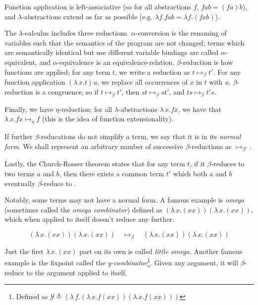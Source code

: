 \documentclass[logo,bsc,singlespacing,parskip,online]{infthesis}
\begin{document}
Function application is left-associative (so for all abstractions $f$, $f a b =
(f a) b$), and $\lambda$-abstractions extend as far as possible (e.g. $\lambda
f. f a b = \lambda f. (f a b)$).

The $\lambda$-calculus includes three reductions. $\alpha$-conversion is the
renaming of variables such that the semantics of the program are not changed;
terms which are semantically identical but use different variable bindings are
called $\alpha$-equivalent, and $\alpha$-equivalence is an equivalence-relation.
$\beta$-reduction is how functions are applied; for any term $t$, we write a
reduction as $t \mapsto_{\beta} t'$. For any function application $(\lambda \,
x. t) u$, we replace all occurrences of $x$ in $t$ with $u$. $\beta$-reduction
is a congruence, so if $t \mapsto_{\beta} t'$, then $st \mapsto_{\beta} st'$,
and $ts \mapsto_{\beta} t's$.

Finally, we have $\eta$-reduction; for all $\lambda$-abstractions $\lambda \, x.
f x$, we have that $\lambda \, x. f x \mapsto_{\eta} f$ (this is the idea of
function extensionality).

If further $\beta$-reducations do not simplify a term, we say that it is in its
\textit{normal form}. We shall represent an arbitrary number of successive
$\beta$-reductions as $\mapsto_{\beta^{\star}}$.

Lastly, the Church-Rosser theorem states that for any term $t$, if it
$\beta$-reduces to two terms $a$ and $b$, then there exists a common term $t'$
which both $a$ and $b$ eventually $\beta$-reduce to
\citep{church_properties_1936}.

Notably, some terms may not have a normal form. A famous example is
\textit{omega} (sometimes called the \textit{omega combinator}) defined as
$(\lambda \, x. (x x)) (\lambda \, x. (x x))$, which when applied to itself
doesn't reduce any further.

\begin{equation*}
  (\lambda \, x. (x x)) (\lambda \, x. (x x)) \quad \mapsto_{\beta} \quad (\lambda \, x. (x x)) (\lambda \, x. (x x))
\end{equation*}

Just the first $\lambda \, x. (x x)$ part on its own is called \textit{little
omega}. Another famous example is the fixpoint called the
\textit{y-combinator}\footnote{Defined as $\mathcal{Y} \triangleq (\lambda \, f.
(\lambda \, x. f (x x )) (\lambda \, x. f (xx)))$}. Given any argument, it will
$\beta$-reduce to the argument applied to itself.
\end{document}
